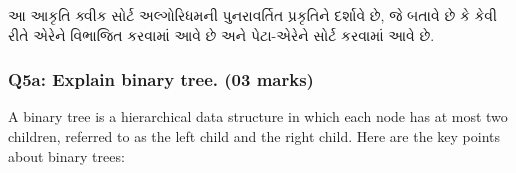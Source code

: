 \begin{Shaded}
\begin{Highlighting}[]
\end{Highlighting}
\end{Shaded}

આ આકૃતિ ક્વીક સોર્ટ અલ્ગોરિધમની પુનરાવર્તિત પ્રકૃતિને દર્શાવે છે, જે બતાવે છે કે કેવી રીતે
એરેને વિભાજિત કરવામાં આવે છે અને પેટા-એરેને સોર્ટ કરવામાં આવે છે.

\hypertarget{q5a-explain-binary-tree.-03-marks}{%
\subsubsection{Q5a: Explain binary tree. (03
marks)}\label{q5a-explain-binary-tree.-03-marks}}

A binary tree is a hierarchical data structure in which each node has at
most two children, referred to as the left child and the right child.
Here are the key points about binary trees:


